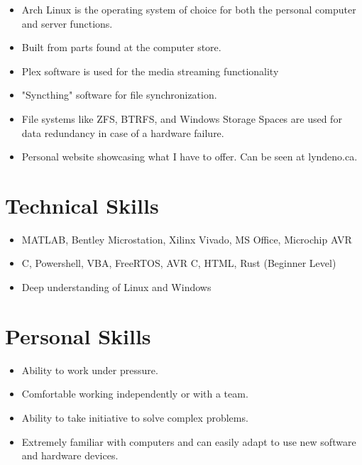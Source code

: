 \documentclass{lsanche_cv}
\begin{document}
\begin{multicols*}{2}
    \divider

      \begin{itemize}
        \item Arch Linux is the operating system of choice for both the personal computer and server functions.
        \item Built from parts found at the computer store.
        \item Plex software is used for the media streaming functionality
        \item "Syncthing" software for file synchronization.
        \item File systems like ZFS, BTRFS, and Windows Storage Spaces are used for data redundancy in case of a hardware failure.
      \end{itemize}

    \divider

      \begin{itemize}
        \item Personal website showcasing what I have to offer. Can be seen at lyndeno.ca.
      \end{itemize}
    
    \section{Technical Skills}
      \begin{itemize}
        \item MATLAB, Bentley Microstation, Xilinx Vivado, MS Office, Microchip AVR
        \item C, Powershell, VBA, FreeRTOS, AVR C, HTML, Rust (Beginner Level)
        \item Deep understanding of Linux and Windows
      \end{itemize}
    
    \section{Personal Skills}
      \begin{itemize}
        \item Ability to work under pressure.
        \item Comfortable working independently or with a team.
        \item Ability to take initiative to solve complex problems.
        \item Extremely familiar with computers and can easily adapt to use new software and hardware devices.
      \end{itemize}
\end{multicols*}
\end{document}
